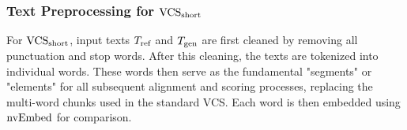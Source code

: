 \subsubsection{Text Preprocessing for \texorpdfstring{$\text{VCS}_{\text{short}}$}{VCSshort}} %
For $\text{VCS}_{\text{short}}$, input texts $T_{\text{ref}}$ and $T_{\text{gen}}$ are first cleaned by removing all punctuation and stop words. After this cleaning, the texts are tokenized into individual words. These words then serve as the fundamental "segments" or "elements" for all subsequent alignment and scoring processes, replacing the multi-word chunks used in the standard VCS. Each word is then embedded using $\text{nvEmbed}$\cite{lee2024nv} for comparison. 